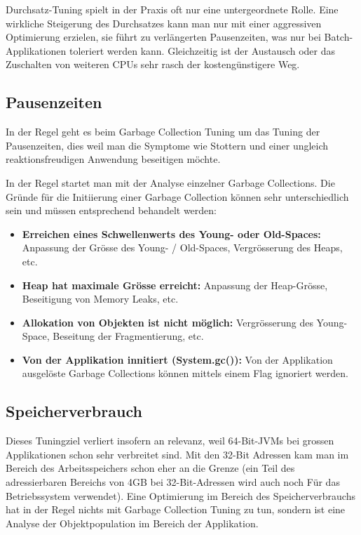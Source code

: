 Durchsatz-Tuning spielt in der Praxis oft nur eine untergeordnete Rolle\cite{langerkreftJavaCore}. Eine wirkliche Steigerung des Durchsatzes kann man nur mit einer aggressiven Optimierung erzielen, sie führt zu verlängerten Pausenzeiten, was nur bei Batch-Applikationen toleriert werden kann. Gleichzeitig ist der Austausch oder das Zuschalten von weiteren CPUs sehr rasch der kostengünstigere Weg.

\subsection{Pausenzeiten\label{gc_tuning_pausenzeiten}}
In der Regel geht es beim Garbage Collection Tuning um das Tuning der Pausenzeiten, dies weil man die Symptome wie Stottern und einer ungleich reaktionsfreudigen Anwendung beseitigen möchte. 

In der Regel startet man mit der Analyse einzelner Garbage Collections. Die Gründe für die Initiierung einer Garbage Collection können sehr unterschiedlich sein und müssen entsprechend behandelt werden:
\begin{itemize}
\item \textbf{Erreichen eines Schwellenwerts des Young- oder Old-Spaces: } Anpassung der Grösse des Young- / Old-Spaces, Vergrösserung des Heaps, etc.
\item \textbf{Heap hat maximale Grösse erreicht:} Anpassung der Heap-Grösse, Beseitigung von Memory Leaks, etc.
\item \textbf{Allokation von Objekten ist nicht möglich:} Vergrösserung des Young-Space, Beseitung der Fragmentierung, etc. 
\item \textbf{Von der Applikation innitiert (System.gc()):} Von der Applikation ausgelöste Garbage Collections können mittels einem Flag ignoriert werden.
\end{itemize}



\subsection{Speicherverbrauch\label{gc_tuning_speicherverbrauch}}
Dieses Tuningziel verliert insofern an relevanz, weil 64-Bit-JVMs bei grossen Applikationen schon sehr verbreitet sind. Mit den 32-Bit Adressen kam man im Bereich des Arbeitsspeichers schon eher an die Grenze (ein Teil des adressierbaren Bereichs von 4GB bei 32-Bit-Adressen wird auch noch Für das Betriebssystem verwendet). Eine Optimierung im Bereich des Speicherverbrauchs hat in der Regel nichts mit Garbage Collection Tuning zu tun, sondern ist eine Analyse der Objektpopulation im Bereich der Applikation.


